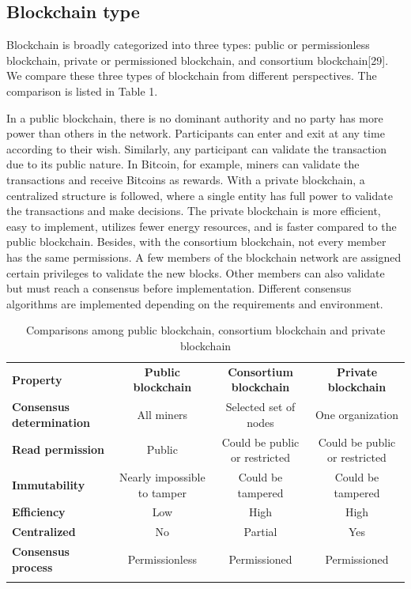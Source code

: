 \documentclass[lettersize,journal]{IEEEtran}
\begin{document}
\subsection{Blockchain type}
Blockchain is broadly categorized into three types: public or permissionless blockchain, private or permissioned blockchain, and consortium blockchain[29]. We compare these three types of blockchain from different perspectives. The comparison is listed in Table 1. 

In a public blockchain, there is no dominant authority and no party has more power than others in the network. Participants can enter and exit at any time according to their wish. Similarly, any participant can validate the transaction due to its public nature. In Bitcoin, for example, miners can validate the transactions and receive Bitcoins as rewards. With a private blockchain, a centralized structure is followed, where a single entity has full power to validate the transactions and make decisions. The private blockchain is more efficient, easy to implement, utilizes fewer energy resources, and is faster compared to the public blockchain. Besides, with the consortium blockchain, not every member has the same permissions. A few members of the blockchain network are assigned certain privileges to validate the new blocks. Other members can also validate but must reach a consensus before implementation. Different consensus algorithms are implemented depending on the requirements and environment. 

\renewcommand\arraystretch{1.5}%
\begin{table}
 \caption{\centering Comparisons among public blockchain, consortium blockchain and private blockchain}
    \centering
   \begin{tabular}{@{}lccc@{}}
     \Xhline{1.2pt}%
    \textbf{Property} & \textbf{Public blockchain} & \textbf{Consortium blockchain} & \textbf{Private blockchain} \\
     \Xhline{1.2pt}%
    \textbf{Consensus determination} & All miners & Selected set of nodes & One organization \\
    \textbf{Read permission} & Public & Could be public or restricted & Could be public or restricted \\
    \textbf{Immutability} & Nearly impossible to tamper & Could be tampered & Could be tampered \\
    \textbf{Efficiency} & Low & High & High \\
    \textbf{Centralized} & No & Partial & Yes \\
    \textbf{Consensus process} & Permissionless & Permissioned & Permissioned \\
     \Xhline{1.2pt}%
  \end{tabular}
 
  \label{tab:blockchain}
\end{table}
\end{document}

